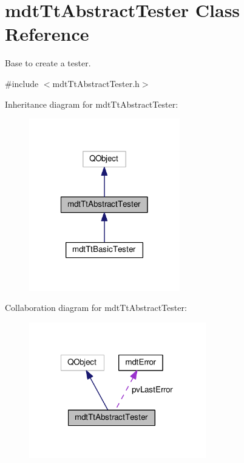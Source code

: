 \hypertarget{classmdt_tt_abstract_tester}{\section{mdt\-Tt\-Abstract\-Tester Class Reference}
\label{classmdt_tt_abstract_tester}
}


Base to create a tester.  




{\ttfamily \#include $<$mdt\-Tt\-Abstract\-Tester.\-h$>$}



Inheritance diagram for mdt\-Tt\-Abstract\-Tester\-:
\nopagebreak
\begin{figure}[H]
\begin{center}
\leavevmode
\includegraphics[width=186pt]{classmdt_tt_abstract_tester__inherit__graph}
\end{center}
\end{figure}


Collaboration diagram for mdt\-Tt\-Abstract\-Tester\-:
\nopagebreak
\begin{figure}[H]
\begin{center}
\leavevmode
\includegraphics[width=218pt]{classmdt_tt_abstract_tester__coll__graph}
\end{center}
\end{figure}
